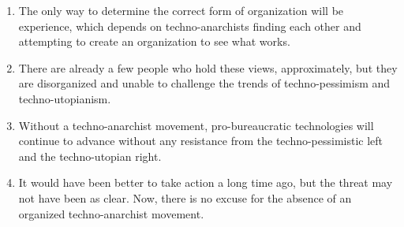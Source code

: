 \documentclass{article}
\begin{document}
\begin{enumerate}
\item The only way to determine the correct form of organization will be experience, which depends on techno-anarchists finding each other and attempting to create an organization to see what works.
\item There are already a few people who hold these views, approximately, but they are disorganized and unable to challenge the trends of techno-pessimism and techno-utopianism.
\item Without a techno-anarchist movement, pro-bureaucratic technologies will continue to advance without any resistance from the techno-pessimistic left and the techno-utopian right.
\item It would have been better to take action a long time ago, but the threat may not have been as clear. Now, there is no excuse for the absence of an organized techno-anarchist movement.
\end{enumerate}
\end{document}
